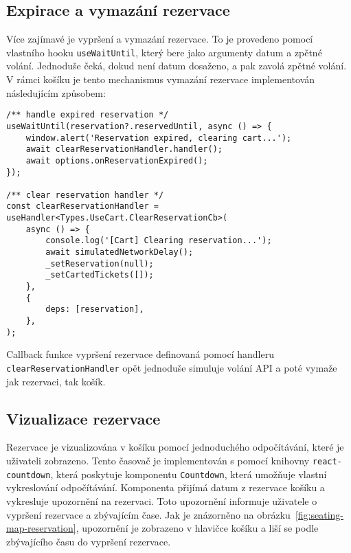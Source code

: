 \subsection{Expirace a vymazání rezervace}
\label{subsec:implementace-rezervace-expirace}
Více zajímavé je vypršení a vymazání rezervace.
To je provedeno pomocí vlastního hooku \texttt{useWaitUntil}, který bere jako argumenty datum a zpětné volání.
Jednoduše čeká, dokud není datum dosaženo, a pak zavolá zpětné volání.
V rámci košíku je tento mechanismus vymazání rezervace implementován následujícím způsobem:

\begin{verbatim}
/** handle expired reservation */
useWaitUntil(reservation?.reservedUntil, async () => {
	window.alert('Reservation expired, clearing cart...');
	await clearReservationHandler.handler();
	await options.onReservationExpired();
});

/** clear reservation handler */
const clearReservationHandler = useHandler<Types.UseCart.ClearReservationCb>(
	async () => {
		console.log('[Cart] Clearing reservation...');
		await simulatedNetworkDelay();
		_setReservation(null);
		_setCartedTickets([]);
	},
	{
		deps: [reservation],
	},
);
\end{verbatim}

Callback funkce vypršení rezervace definovaná pomocí handleru \texttt{clearReservationHandler} opět jednoduše simuluje volání API a poté vymaže jak rezervaci, tak košík.

\subsection{Vizualizace rezervace}
\label{subsec:implementace-rezervace-vizualizace}
Rezervace je vizualizována v košíku pomocí jednoduchého odpočítávání, které je uživateli zobrazeno.
Tento časovač je implementován s pomocí knihovny \texttt{react-countdown}, která poskytuje komponentu \texttt{Countdown}, která umožňuje vlastní vykreslování odpočítávání.
Komponenta přijímá datum z rezervace košíku a vykresluje upozornění na rezervaci.
Toto upozornění informuje uživatele o vypršení rezervace a zbývajícím čase.
Jak je znázorněno na obrázku~\ref{fig:seating-map-reservation}, upozornění je zobrazeno v hlavičce košíku a liší se podle zbývajícího času do vypršení rezervace.

